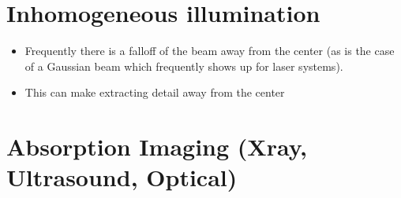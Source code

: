 \documentclass[letterpaper,10pt,english]{sphinxmanual}
\begin{document}
\noindent{}


\section{Inhomogeneous illumination}
\label{\detokenize{04-BasicSegmentation:inhomogeneous-illumination}}\begin{itemize}
\item {} 
\sphinxAtStartPar
Frequently there is a fall\sphinxhyphen{}off of the beam away from the center (as is the case of a Gaussian beam which frequently shows up for laser systems).

\item {} 
\sphinxAtStartPar
This can make extracting detail away from the center

\end{itemize}

\begin{sphinxVerbatim}[commandchars=\\\{\}]
      
  
\end{sphinxVerbatim}

\noindent{}


\section{Absorption Imaging (X\sphinxhyphen{}ray, Ultrasound, Optical)}
\label{\detokenize{04-BasicSegmentation:absorption-imaging-x-ray-ultrasound-optical}}
\end{document}
